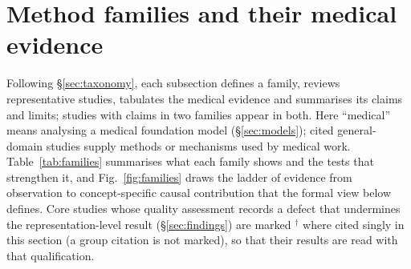 \section{Method families and their medical evidence}
\label{sec:methods}

Following \S\ref{sec:taxonomy}, each subsection defines a family, reviews representative
studies, tabulates the medical evidence and summarises its claims and limits; studies with claims
in two families appear in both. Here ``medical'' means analysing a medical foundation model
(\S\ref{sec:models}); cited general-domain studies supply methods or mechanisms used by medical work. Table~\ref{tab:families} summarises what each family
shows and the tests that strengthen it, and Fig.~\ref{fig:families} draws the ladder of evidence from
observation to concept-specific causal contribution that the formal view below defines. Core studies whose quality assessment records a defect that undermines the representation-level result (\S\ref{sec:findings}) are marked $^{\dagger}$ where cited singly in this section (a group citation is not marked), so that their results are read with that qualification.


